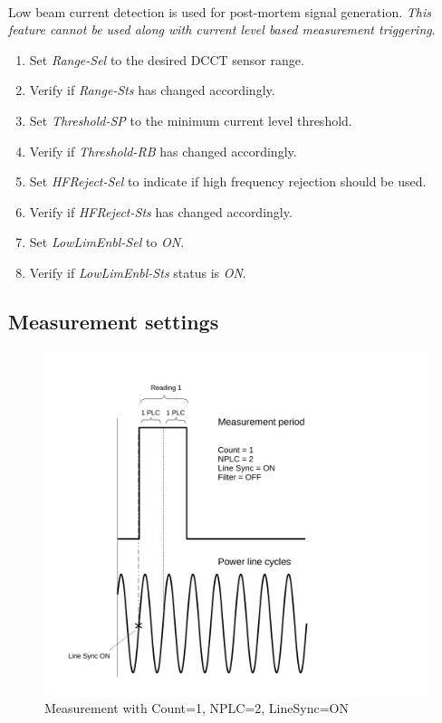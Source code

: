 \documentclass[openany]{article}
\begin{document}
		\paragraph{} Low beam current detection is used for post-mortem signal generation. \emph{This feature cannot be used along with current level based measurement triggering}.

			\begin{enumerate}
			\item Set \emph{Range-Sel} to the desired DCCT sensor range.
			\item Verify if \emph{Range-Sts} has changed accordingly.
			\item Set \emph{Threshold-SP} to the minimum current level threshold.
			\item Verify if \emph{Threshold-RB} has changed accordingly.
			\item Set \emph{HFReject-Sel} to indicate if high frequency rejection should be used.
			\item Verify if \emph{HFReject-Sts} has changed accordingly.
			\item Set \emph{LowLimEnbl-Sel} to \emph{ON}.
			\item Verify if \emph{LowLimEnbl-Sts} status is \emph{ON}.
			\end{enumerate}

	\subsection{Measurement settings}

		\begin{figure}[!h]
		\caption{Measurement with Count=1, NPLC=2, LineSync=ON}
		\label{fig:meas-param1}
		\centering
		\includegraphics[width=1.0\textwidth]{dcct-meas-param1-image}
		\end{figure}
\end{document}
